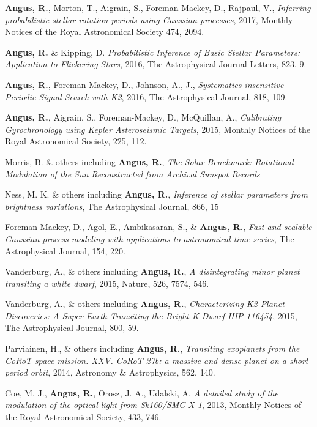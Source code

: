 \documentclass[12pt,letterpaper]{article}
\begin{document}
\begin{list}{}{\cvlist}
\item
    {\bf Angus, R.}, Morton, T., Aigrain, S., Foreman-Mackey, D., Rajpaul, V.,
    {\it Inferring probabilistic stellar rotation periods using Gaussian
    processes}, 2017, Monthly Notices of the Royal Astronomical Society
    474, 2094.
\item
    {\bf Angus, R.} \& Kipping, D. {\it Probabilistic Inference of Basic
    Stellar Parameters: Application to Flickering Stars}, 2016, The
    Astrophysical Journal Letters, 823, 9.
\item
    {\bf Angus, R.}, Foreman-Mackey, D., Johnson, A., J., {\it
    Systematics-insensitive Periodic Signal Search with K2}, 2016, The
    Astrophysical Journal, 818, 109.
\item
    {\bf Angus, R.}, Aigrain, S., Foreman-Mackey, D., McQuillan, A., {\it
    Calibrating Gyrochronology using Kepler Asteroseismic Targets}, 2015,
    Monthly Notices of the Royal Astronomical Society, 225, 112.
\end{list}

\begin{list}{}{\cvlist}
\item
    Morris, B. \& others including {\bf Angus, R.},
    {\it The Solar Benchmark: Rotational Modulation of the Sun Reconstructed
    from Archival Sunspot Records}
\item
    Ness, M. K. \& others including {\bf Angus, R.},
    {\it Inference of stellar parameters from brightness variations},
    The Astrophysical Journal, 866, 15
\item
    Foreman-Mackey, D., Agol, E., Ambikasaran, S., \& {\bf Angus, R.}, {\it
    Fast and scalable Gaussian process modeling with applications to
    astronomical time series}, The Astrophysical Journal, 154, 220.
\item
    Vanderburg, A., \& others including {\bf Angus, R.},
    {\it A disintegrating minor planet transiting a white dwarf}, 2015,
    Nature, 526, 7574, 546.
\item
Vanderburg, A., \& others including {\bf Angus, R.},
    {\it Characterizing K2 Planet Discoveries: A Super-Earth Transiting the
    Bright K Dwarf HIP 116454}, 2015, The Astrophysical Journal, 800, 59.
\item
Parviainen, H., \& others including {\bf Angus, R.},
    {\it Transiting exoplanets from the CoRoT space mission. XXV. CoRoT-27b: a
    massive and dense planet on a short-period orbit}, 2014, Astronomy \&
    Astrophysics, 562, 140.
\item
    Coe, M. J., {\bf Angus, R.}, Orosz, J. A., Udalski, A. {\it A detailed
    study of the modulation of the optical light from Sk160/SMC X-1}, 2013,
    Monthly Notices of the Royal Astronomical Society, 433, 746.
\end{list}
\end{document}
